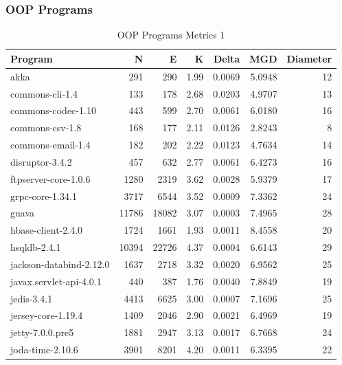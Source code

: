 \documentclass[12pt, a4paper]{article}
\begin{document}
\subsubsection{OOP Programs}
\begin{longtable}[H]{l r r r r r r}
    \caption{OOP Programs Metrics 1}\label{table:oop_metrics_1}\\
        Program &  N & E & K & Delta & MGD & Diameter\\
        \hline            
        \endhead
        akka                          &   291 &   290 & 1.99 & 0.0069 & 5.0948 & 12 \\ 
        commons-cli-1.4               &   133 &   178 & 2.68 & 0.0203 & 4.9707 & 13 \\ 
        commons-codec-1.10            &   443 &   599 & 2.70 & 0.0061 & 6.0180 & 16 \\ 
        commons-csv-1.8               &   168 &   177 & 2.11 & 0.0126 & 2.8243 &  8 \\ 
        commons-email-1.4             &   182 &   202 & 2.22 & 0.0123 & 4.7634 & 14 \\ 
        disruptor-3.4.2               &   457 &   632 & 2.77 & 0.0061 & 6.4273 & 16 \\ 
        ftpserver-core-1.0.6          &  1280 &  2319 & 3.62 & 0.0028 & 5.9379 & 17 \\ 
        grpc-core-1.34.1              &  3717 &  6544 & 3.52 & 0.0009 & 7.3362 & 24 \\ 
        guava                         & 11786 & 18082 & 3.07 & 0.0003 & 7.4965 & 28 \\ 
        hbase-client-2.4.0            &  1724 &  1661 & 1.93 & 0.0011 & 8.4558 & 20 \\ 
        hsqldb-2.4.1                  & 10394 & 22726 & 4.37 & 0.0004 & 6.6143 & 29 \\ 
        jackson-databind-2.12.0       &  1637 &  2718 & 3.32 & 0.0020 & 6.9562 & 25 \\ 
        javax.servlet-api-4.0.1       &   440 &   387 & 1.76 & 0.0040 & 7.8849 & 19 \\ 
        jedis-3.4.1                   &  4413 &  6625 & 3.00 & 0.0007 & 7.1696 & 25 \\ 
        jersey-core-1.19.4            &  1409 &  2046 & 2.90 & 0.0021 & 6.4969 & 19 \\ 
        jetty-7.0.0.pre5              &  1881 &  2947 & 3.13 & 0.0017 & 6.7668 & 24 \\ 
        joda-time-2.10.6              &  3901 &  8201 & 4.20 & 0.0011 & 6.3395 & 22 \\ 

\end{longtable}
\end{document}
